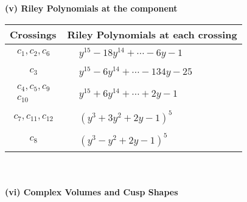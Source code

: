 \documentclass[1p]{elsarticle_modified}
\theoremstyle{definition}
\begin{document}
\newpage\renewcommand{\arraystretch}{1}
\flushleft \textbf{(v) Riley Polynomials at the component}\newline \\
\begin{tabular}{m{50pt}|m{274pt}}
Crossings & \hspace{64pt}Riley Polynomials at each crossing \\
\hline $$\begin{aligned}c_{1},c_{2},c_{6}\end{aligned}$$&$\begin{aligned}
&y^{15}-18 y^{14}+\cdots-6 y-1
\end{aligned}$\\
\hline $$\begin{aligned}c_{3}\end{aligned}$$&$\begin{aligned}
&y^{15}-6 y^{14}+\cdots-134 y-25
\end{aligned}$\\
\hline $$\begin{aligned}c_{4},c_{5},c_{9}\\c_{10}\end{aligned}$$&$\begin{aligned}
&y^{15}+6 y^{14}+\cdots+2 y-1
\end{aligned}$\\
\hline $$\begin{aligned}c_{7},c_{11},c_{12}\end{aligned}$$&$\begin{aligned}
&(y^3+3 y^2+2 y-1)^5
\end{aligned}$\\
\hline $$\begin{aligned}c_{8}\end{aligned}$$&$\begin{aligned}
&(y^3- y^2+2 y-1)^5
\end{aligned}$\\
\hline
\end{tabular}\\~\\
\newpage\flushleft \textbf{(vi) Complex Volumes and Cusp Shapes}
\end{document}
